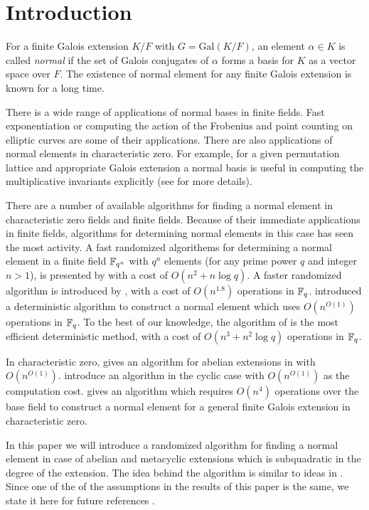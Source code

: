 \section{Introduction}

For a finite Galois extension $K/F$ with $G = \mathrm{Gal}(K/F)$, an
element $\alpha \in K$ is called \emph{normal} if the set of Galois
conjugates of $\alpha$ forms a basis for $K$ as a vector space over
$F$. The existence of normal element for any finite Galois extension is
known for a long time.
 
There is a wide range of applications of normal bases in finite
fields. Fast exponentiation or computing the action of the Frobenius and
point counting on elliptic curves are some of their applications. There are
also applications of normal elements in characteristic zero. For example,
for a given permutation lattice and appropriate Galois extension a normal
basis is useful in computing the multiplicative invariants explicitly (see
\cite{Armin} for more details).

There are a number of available algorithms for finding a normal element in
characteristic zero fields and finite fields.  Because of their immediate
applications in finite fields, algorithms for determining normal elements
in this case has seen the most activity.  A fast randomized algorithems for
determining a normal element in a finite field $\mathbb{F}_{q^n}$ with $q^n$
elements (for any prime power $q$ and integer $n>1$), is presented by
 with a cost of $O(n^2+n\log q)$.  A faster randomized
algorithm is introduced by , with a cost of $O(n^{1.8})$
operations in $\mathbb{F}_q$.   introduced a
deterministic algorithm to construct a normal element which uses
$O(n^{O(1)})$ operations in $\mathbb{F}_q$.  To the best of our knowledge, the
algorithm of  is the most efficient
deterministic method, with a cost of $O(n^3+n^2\log q)$ operations in
$\mathbb{F}_q$.

In characteristic zero,  gives an algorithm for abelian
extensions in with $O(n^{O(1)})$.   introduce an algorithm
in the cyclic case with $O(n^{O(1)})$ as the computation cost.
 gives an algorithm which requires $O(n^4)$ operations
over the base field to construct a normal element for a general finite
Galois extension in characteristic zero.

In this paper we will introduce a randomized algorithm for finding a normal
element in case of abelian and metacyclic extensions which is subquadratic
in the degree of the extension. The idea behind the algorithm is similar to
ideas in \cite{Giesbrecht,Kaltofen}. Since one of the of the assumptions in the
results of this paper is the same, we state it here for future references .

